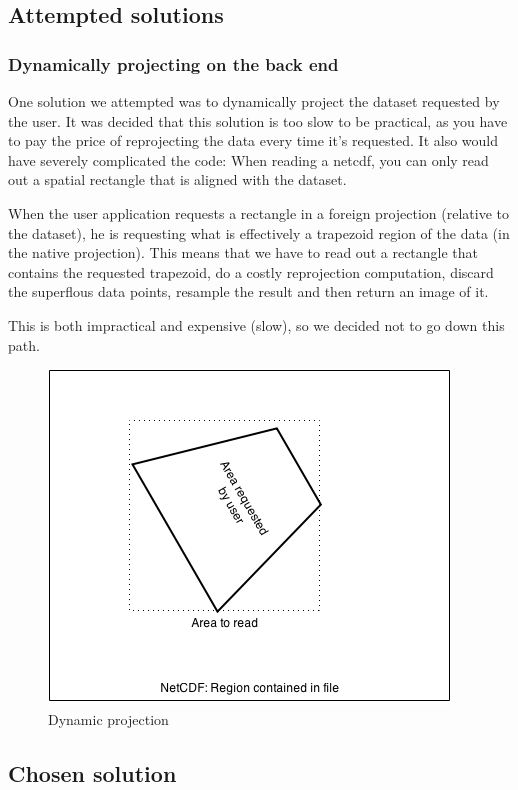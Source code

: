 \documentclass[11pt,a4paper,titlepage,oneside]{report}
\begin{document}
\subsection{Attempted solutions}
\subsubsection{Dynamically projecting on the back end}
One solution we attempted was to dynamically project the dataset requested by the user. It was decided that this solution is too slow to be practical, as you have to pay the price of reprojecting the data every time it's requested. It also would have severely complicated the code: When reading a \gls{netcdf}, you can only read out a spatial rectangle that is aligned with the dataset.

When the user application requests a rectangle in a foreign projection (relative to the dataset), he is requesting what is effectively a trapezoid region of the data (in the native projection).
This means that we have to read out a rectangle that contains the requested trapezoid, do a costly reprojection computation, discard the superflous data points, resample the result and then return an image of it.

This is both impractical and expensive (slow), so we decided not to go down this path.

\begin{figure}[h]
\includegraphics{img/dynamic_projection.png}
  \caption{Dynamic projection}
    \label{fig:tileMatrixSet}
\end{figure}


\subsection{Chosen solution}
\end{document}
